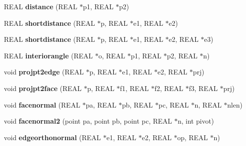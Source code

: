 \begin{DoxyCompactItemize}
\item 
\hypertarget{classtetgenmesh_a4f2849235299c81ad7d585dc0b657d80}{R\-E\-A\-L {\bfseries distance} (R\-E\-A\-L $\ast$p1, R\-E\-A\-L $\ast$p2)}\label{classtetgenmesh_a4f2849235299c81ad7d585dc0b657d80}

\item 
\hypertarget{classtetgenmesh_a4038b1e2dd2333374426540d0d4df0d8}{R\-E\-A\-L {\bfseries shortdistance} (R\-E\-A\-L $\ast$p, R\-E\-A\-L $\ast$e1, R\-E\-A\-L $\ast$e2)}\label{classtetgenmesh_a4038b1e2dd2333374426540d0d4df0d8}

\item 
\hypertarget{classtetgenmesh_a4b42b7c13d31c7f0c893a3f7a01676d4}{R\-E\-A\-L {\bfseries shortdistance} (R\-E\-A\-L $\ast$p, R\-E\-A\-L $\ast$e1, R\-E\-A\-L $\ast$e2, R\-E\-A\-L $\ast$e3)}\label{classtetgenmesh_a4b42b7c13d31c7f0c893a3f7a01676d4}

\item 
\hypertarget{classtetgenmesh_a814827be2067d8163a688c7fc017972f}{R\-E\-A\-L {\bfseries interiorangle} (R\-E\-A\-L $\ast$o, R\-E\-A\-L $\ast$p1, R\-E\-A\-L $\ast$p2, R\-E\-A\-L $\ast$n)}\label{classtetgenmesh_a814827be2067d8163a688c7fc017972f}

\item 
\hypertarget{classtetgenmesh_ac22152fa0a43b549ae37cadff0e8c56f}{void {\bfseries projpt2edge} (R\-E\-A\-L $\ast$p, R\-E\-A\-L $\ast$e1, R\-E\-A\-L $\ast$e2, R\-E\-A\-L $\ast$prj)}\label{classtetgenmesh_ac22152fa0a43b549ae37cadff0e8c56f}

\item 
\hypertarget{classtetgenmesh_a298e94262eee21b087476e970d8324e9}{void {\bfseries projpt2face} (R\-E\-A\-L $\ast$p, R\-E\-A\-L $\ast$f1, R\-E\-A\-L $\ast$f2, R\-E\-A\-L $\ast$f3, R\-E\-A\-L $\ast$prj)}\label{classtetgenmesh_a298e94262eee21b087476e970d8324e9}

\item 
\hypertarget{classtetgenmesh_a704e4042d62cb6bd2906e1515233a677}{void {\bfseries facenormal} (R\-E\-A\-L $\ast$pa, R\-E\-A\-L $\ast$pb, R\-E\-A\-L $\ast$pc, R\-E\-A\-L $\ast$n, R\-E\-A\-L $\ast$nlen)}\label{classtetgenmesh_a704e4042d62cb6bd2906e1515233a677}

\item 
\hypertarget{classtetgenmesh_a63ef98a5aaa1cf2303ba6c7e6e630458}{void {\bfseries facenormal2} (point pa, point pb, point pc, R\-E\-A\-L $\ast$n, int pivot)}\label{classtetgenmesh_a63ef98a5aaa1cf2303ba6c7e6e630458}

\item 
\hypertarget{classtetgenmesh_a3180cc601a9d44fc07a9cfe4749885ef}{void {\bfseries edgeorthonormal} (R\-E\-A\-L $\ast$e1, R\-E\-A\-L $\ast$e2, R\-E\-A\-L $\ast$op, R\-E\-A\-L $\ast$n)}\label{classtetgenmesh_a3180cc601a9d44fc07a9cfe4749885ef}


\end{DoxyCompactItemize}
